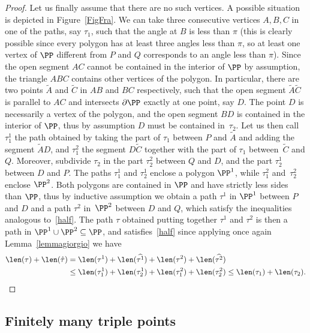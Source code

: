 \begin{proof}
Let us finally assume that there are no such vertices. A possible situation is depicted in Figure~\ref{FigFra}. We can take three consecutive vertices $A, B, C$ in one of the paths, say $\tau_1$, such that the angle at $B$ is less than $\pi$ (this is clearly possible since every polygon has at least three angles less than $\pi$, so at least one vertex of $\PP$ different from $P$ and $Q$ corresponds to an angle less than $\pi$). Since the open segment $AC$ cannot be contained in the interior of $\PP$ by assumption, the triangle $ABC$ contains other vertices of the polygon. In particular, there are two points $\widetilde A$ and $\widetilde C$ in $AB$ and $BC$ respectively, such that the open segment $\widetilde A \widetilde C$ is parallel to $AC$ and intersects $\partial\PP$ exactly at one point, say $D$. The point $D$ is necessarily a vertex of the polygon, and the open segment $BD$ is contained in the interior of $\PP$, thus by assumption $D$ must be contained in~$\tau_2$. Let us then call $\tau_1^1$ the path obtained by taking the part of $\tau_1$ between $P$ and $\widetilde A$ and adding the segment $\widetilde A D$, and $\tau_1^2$ the segment $D\widetilde C$ together with the part of $\tau_1$ between~$\widetilde C$ and $Q$. Moreover, subdivide $\tau_2$ in the part $\tau_2^2$ between $Q$ and $D$, and the part $\tau_2^1$ between $D$ and $P$. The paths $\tau_1^1$ and $\tau_2^1$ enclose a polygon $\PP^1$, while $\tau_1^2$ and~$\tau_2^2$ enclose $\PP^2$. Both polygons are contained in $\PP$ and have strictly less sides than $\PP$, thus by inductive assumption we obtain a path $\tau^1$ in $\PP^1$ between $P$ and $D$ and a path $\tau^2$ in~$\PP^2$ between $D$ and $Q$, which satisfy the inequalities analogous to~\eqref{half}. The path $\tau$ obtained putting together $\tau^1$ and $\tau^2$ is then a path in $\PP^1\cup\PP^2\subseteq \PP$, and satisfies~\eqref{half} since applying once again Lemma~\ref{lemmagiorgio} we have
\begin{align*}
\len(\tau) + \len(\hat\tau) &= \len(\tau^1) + \len(\widehat{\tau^1}) + \len(\tau^2) + \len(\widehat{\tau^2})\\
&\leq \len(\tau_1^1) + \len(\tau_2^1) + \len(\tau_1^2) + \len(\tau_2^2)
\leq \len(\tau_1)+\len(\tau_2).\qedhere
\end{align*}
\end{proof}

\subsection{Finitely many triple points\label{triplepoints}}

